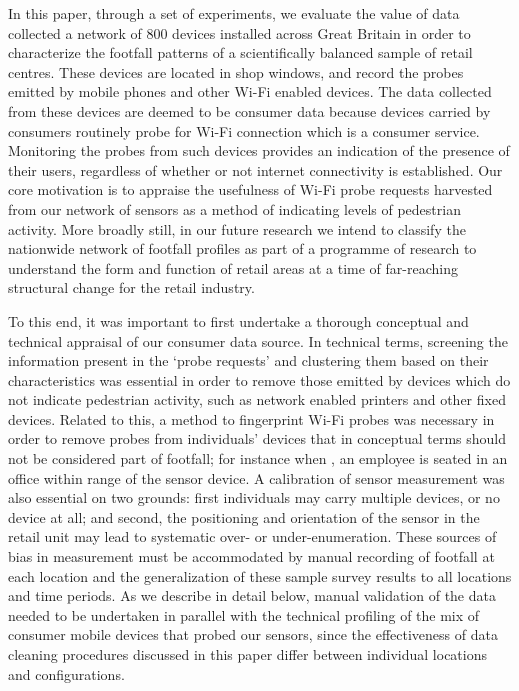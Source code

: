 In this paper, through a set of experiments, we evaluate the value of data
collected a network of 800 devices \citep{sss2016} installed across Great
Britain in order to characterize the footfall patterns of a scientifically
balanced sample of retail centres.  These devices are located in shop windows,
and record the probes emitted by mobile phones and other Wi-Fi enabled devices.
The data collected from these devices are deemed to be consumer data because
devices carried by consumers routinely probe for Wi-Fi connection which is a
consumer service.  Monitoring the probes from such devices provides an
indication of the presence of their users, regardless of whether or not internet
connectivity is established.  Our core motivation is to appraise the usefulness
of Wi-Fi probe requests harvested from our network of sensors as a method of
indicating levels of pedestrian activity.  More broadly still, in our future
research we intend to classify the nationwide network of footfall profiles as
part of a programme of research to understand the form and function of retail
areas at a time of far-reaching structural change for the retail industry.

To this end, it was important to first undertake a thorough conceptual and
technical appraisal of our consumer data source.  In technical terms, screening
the information present in the `probe requests' and clustering them based on
their characteristics was essential in order to remove those emitted by devices
which do not indicate pedestrian activity, such as network enabled printers and
other fixed devices.  Related to this, a method to fingerprint Wi-Fi probes was
necessary in order to remove probes from individuals’ devices that in conceptual
terms should not be considered part of footfall; for instance when , an employee
is seated in an office within range of the sensor device.  A calibration of
sensor measurement was also essential on two grounds: first individuals may
carry multiple devices, or no device at all; and second, the positioning and
orientation of the sensor in the retail unit may lead to systematic over- or
under-enumeration.  These sources of bias in measurement must be accommodated by
manual recording of footfall at each location and the generalization of these
sample survey results to all locations and time periods.  As we describe in
detail below, manual validation of the data needed to be undertaken in parallel
with the technical profiling of the mix of consumer mobile devices that probed
our sensors, since the effectiveness of data cleaning procedures discussed in
this paper differ between individual locations and configurations.

